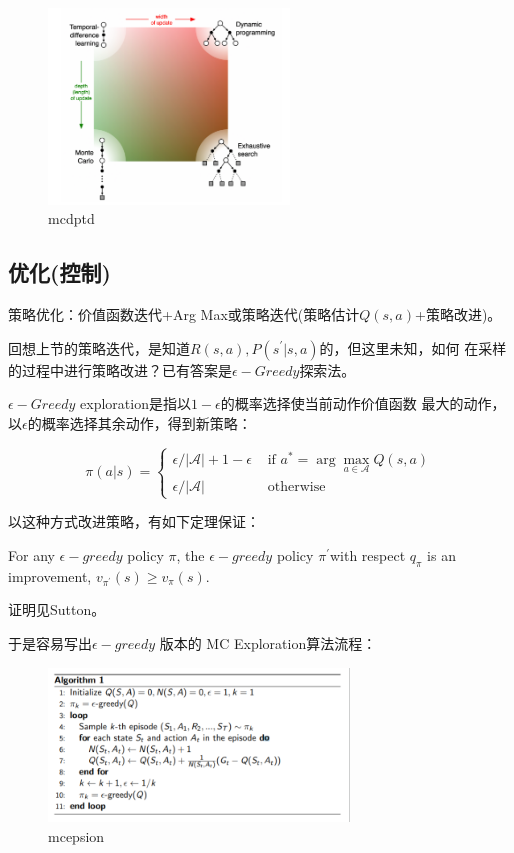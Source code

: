 \documentclass[UTF8]{ctexart}
\begin{document}
\begin{figure}[htbp]
	\centering
	\includegraphics[width=6.4cm, height=5.2cm]{./pic/td_mc_dp_diff.png}
	\caption{mcdptd}
\end{figure}

\subsection{优化(控制)}
策略优化：价值函数迭代+Arg Max或策略迭代(策略估计$Q(s, a)$+策略改进)。

回想上节的策略迭代，是知道$R(s, a), P(s^{\prime}|s, a)$的，但这里未知，如何
在采样的过程中进行策略改进？已有答案是$\epsilon-Greedy$探索法。


$\epsilon-Greedy$ exploration是指以$1-\epsilon$的概率选择使当前动作价值函数
最大的动作，以$\epsilon$的概率选择其余动作，得到新策略：

$$\pi(a | s)=\left\{\begin{array}{ll}
    \epsilon /|\mathcal{A}|+1-\epsilon & \text { if } a^{*}=\arg \max _{a \in \mathcal{A}} Q(s, a) \\
    \epsilon /|\mathcal{A}| & \text { otherwise }
    \end{array}\right.
$$


以这种方式改进策略，有如下定理保证：
\begin{theorem}
    For any $\epsilon-greedy$ policy $\pi$, the $\epsilon-greedy$ policy 
    $\pi^{\prime} $with respect $q_{\pi}$ is an improvement, 
    $v_{\pi^{\prime}}(s) \geq v_{\pi}(s)$.
\end{theorem}

证明见Sutton。

于是容易写出$\epsilon-greedy$ 版本的 MC Exploration算法流程：
\begin{figure}[htbp]
	\centering
	\includegraphics[width=8cm, height=4.1cm]{./pic/mc_epsion.png}
	\caption{mcepsion}
\end{figure}
\end{document}
